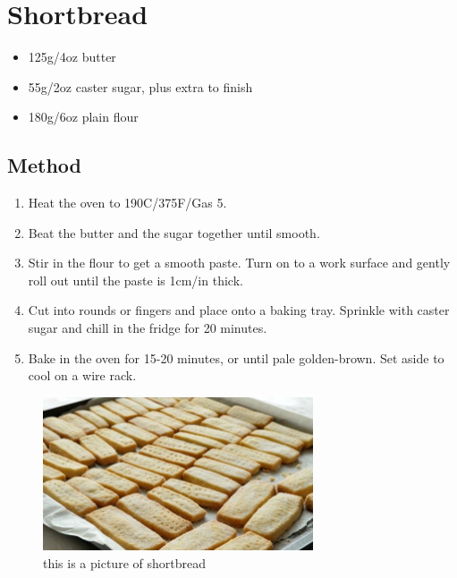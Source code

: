 \section{Shortbread}

\begin{itemize}
	\item 125g/4oz butter
	\item 55g/2oz caster sugar, plus extra to finish
	\item 180g/6oz plain flour
\end{itemize}

\subsection{Method}

\begin{enumerate}
\item Heat the oven to 190C/375F/Gas 5.
\item Beat the butter and the sugar together until smooth.
\item Stir in the flour to get a smooth paste. Turn on to a work surface and gently roll out until the paste is 1cm/in thick.
\item Cut into rounds or fingers and place onto a baking tray. Sprinkle with caster sugar and chill in the fridge for 20 minutes.
\item Bake in the oven for 15-20 minutes, or until pale golden-brown. Set aside to cool on a wire rack.
\end{enumerate}

\begin{figure}[h]
\includegraphics[width=8cm]{shortbread}
\caption{this is a picture of shortbread}
\end{figure}
